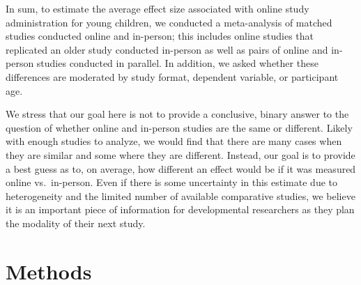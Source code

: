 \documentclass[
  man,floatsintext]{apa6}
\begin{document}
In sum, to estimate the average effect size associated with online study administration for young children, we conducted a meta-analysis of matched studies conducted online and in-person; this includes online studies that replicated an older study conducted in-person as well as pairs of online and in-person studies conducted in parallel. In addition, we asked whether these differences are moderated by study format, dependent variable, or participant age.

We stress that our goal here is not to provide a conclusive, binary answer to the question of whether online and in-person studies are the same or different. Likely with enough studies to analyze, we would find that there are many cases when they are similar and some where they are different. Instead, our goal is to provide a best guess as to, on average, how different an effect would be if it was measured online vs.~in-person. Even if there is some uncertainty in this estimate due to heterogeneity and the limited number of available comparative studies, we believe it is an important piece of information for developmental researchers as they plan the modality of their next study.

\hypertarget{methods}{%
\section{Methods}\label{methods}}
\end{document}

